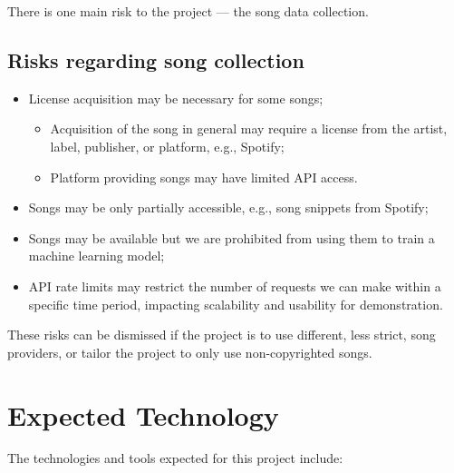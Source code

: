 \documentclass{article}
\begin{document}
There is one main risk to the project --- the song data collection.

\subsection{Risks regarding song collection}
\begin{itemize}
  \item License acquisition may be necessary for some songs;
  \begin{itemize}
    \item Acquisition of the song in general may require a license from the artist, label, publisher, or platform, e.g., Spotify;
    \item Platform providing songs may have limited API access.
  \end{itemize}
  \item Songs may be only partially accessible, e.g., song snippets from Spotify;
  \item Songs may be available but we are prohibited from using them to train a machine learning model;
  \item API rate limits may restrict the number of requests we can make within a specific time period, impacting scalability and usability for demonstration.
\end{itemize}
These risks can be dismissed if the project is to use different, less strict, song providers, or tailor the project to only use non-copyrighted songs.

\section{Expected Technology}

The technologies and tools expected for this project include:
\end{document}

